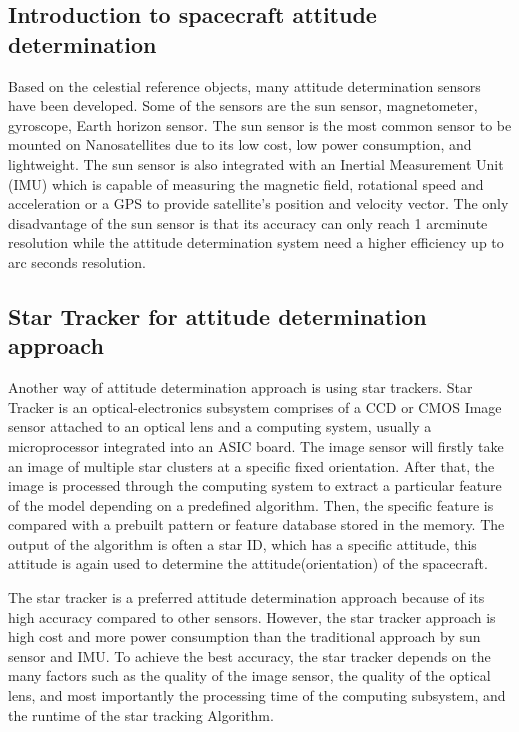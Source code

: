 \subsection{Introduction to spacecraft attitude determination}

Based on the celestial reference objects, many attitude determination sensors have been developed. Some of the sensors are the sun sensor, magnetometer, gyroscope, Earth horizon sensor\cite{MDP}. The sun sensor is the most common sensor to be mounted on Nanosatellites due to its low cost, low power consumption, and lightweight. The sun sensor is also integrated with an Inertial Measurement Unit (IMU) which is capable of measuring the magnetic field, rotational speed and acceleration or a GPS to provide satellite’s position and velocity vector. The only disadvantage of the sun sensor is that its accuracy can only reach 1 arcminute resolution while the attitude determination system need a higher efficiency up to arc seconds resolution\cite{edselc.2-52.0-001938469619810101}.

\subsection{Star Tracker for attitude determination approach}

Another way of attitude determination approach is using star trackers\cite{edseee.38797119950101}. Star Tracker is an optical-electronics subsystem comprises of a CCD or CMOS Image sensor attached to an optical lens and a computing system, usually a microprocessor integrated into an ASIC board. The image sensor will firstly take an image of multiple star clusters at a specific fixed orientation. After that, the image is processed through the computing system to extract a particular feature of the model depending on a predefined algorithm. Then, the specific feature is compared with a prebuilt pattern or feature database stored in the memory. The output of the algorithm is often a star ID, which has a specific attitude, this attitude is again used to determine the attitude(orientation) of the spacecraft. \\


\noindent The star tracker is a preferred attitude determination approach because of its high accuracy compared to other sensors\cite{ntu.19915319780101}. However, the star tracker approach is high cost and more power consumption than the traditional approach by sun sensor and IMU. To achieve the best accuracy, the star tracker depends on the many factors such as the quality of the image sensor, the quality of the optical lens, and most importantly the processing time of the computing subsystem, and the runtime of the star tracking Algorithm. \\

